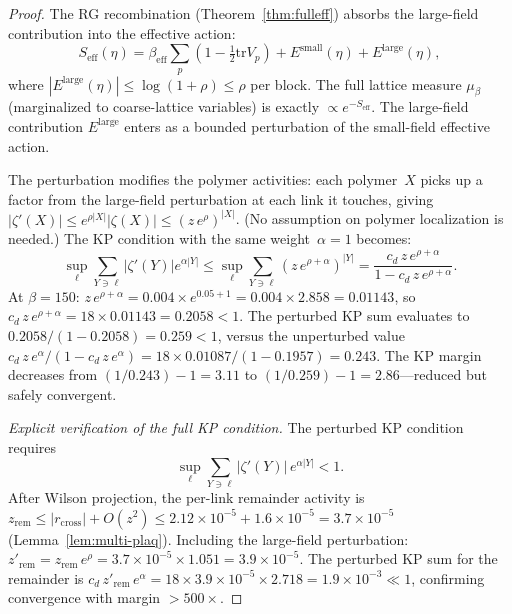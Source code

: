 \documentclass[11pt]{article}
\theoremstyle{definition}
\newcommand{\tr}{\mathrm{tr}}
\begin{document}
\begin{proof}
The RG recombination
(Theorem~\ref{thm:fulleff}) absorbs the large-field
contribution into the effective action:
\begin{equation}
S_{\mathrm{eff}}(\eta)
=\beta_{\mathrm{eff}}\sum_p(1-\tfrac{1}{2}\tr V_p)
+E^{\mathrm{small}}(\eta)
+E^{\mathrm{large}}(\eta),
\end{equation}
where $|E^{\mathrm{large}}(\eta)|\le\log(1+\rho)\le\rho$
per block.
The full lattice measure $\mu_\beta$ (marginalized to
coarse-lattice variables) is exactly
$\propto e^{-S_{\mathrm{eff}}}$.  The large-field
contribution $E^{\mathrm{large}}$ enters as a bounded
perturbation of the small-field effective action.

The perturbation modifies the polymer activities: each
polymer~$X$ picks up a factor from the large-field
perturbation at each link it touches, giving
$|\zeta'(X)|\le e^{\rho|X|}|\zeta(X)|\le (z\,e^\rho)^{|X|}$.
(No assumption on polymer localization is needed.)
The KP condition with the same
weight~$\alpha=1$ becomes:
\begin{equation}
\sup_\ell\sum_{Y\ni\ell}|\zeta'(Y)|e^{\alpha|Y|}
\le\sup_\ell\sum_{Y\ni\ell}(z\,e^{\rho+\alpha})^{|Y|}
=\frac{c_d\,z\,e^{\rho+\alpha}}{1-c_d\,z\,e^{\rho+\alpha}}.
\end{equation}
At $\beta=150$: $z\,e^{\rho+\alpha}=0.004\times e^{0.05+1}
=0.004\times 2.858=0.01143$, so $c_d\,z\,e^{\rho+\alpha}
=18\times 0.01143=0.2058<1$.  The perturbed KP sum evaluates to
$0.2058/(1-0.2058)=0.259<1$, versus the unperturbed value
$c_d\,z\,e^\alpha/(1-c_d\,z\,e^\alpha)
=18\times 0.01087/(1-0.1957)=0.243$.
The KP margin decreases from
$(1/0.243)-1=3.11$ to $(1/0.259)-1=2.86$---reduced but
safely convergent.

\emph{Explicit verification of the full KP condition.}
The perturbed KP condition requires
\begin{equation}
\sup_\ell\sum_{Y\ni\ell}|\zeta'(Y)|\,e^{\alpha|Y|}<1.
\end{equation}
After Wilson projection, the per-link remainder activity is
$z_{\mathrm{rem}}\le|r_{\mathrm{cross}}|+O(z^2)
\le 2.12\times 10^{-5}+1.6\times 10^{-5}
=3.7\times 10^{-5}$ (Lemma~\ref{lem:multi-plaq}).
Including the large-field perturbation:
$z'_{\mathrm{rem}}=z_{\mathrm{rem}}\,e^\rho
=3.7\times 10^{-5}\times 1.051=3.9\times 10^{-5}$.
The perturbed KP sum for the remainder is
$c_d\,z'_{\mathrm{rem}}\,e^\alpha
=18\times 3.9\times 10^{-5}\times 2.718
=1.9\times 10^{-3}\ll 1$,
confirming convergence with margin $>500\times$.


\end{proof}
\end{document}
